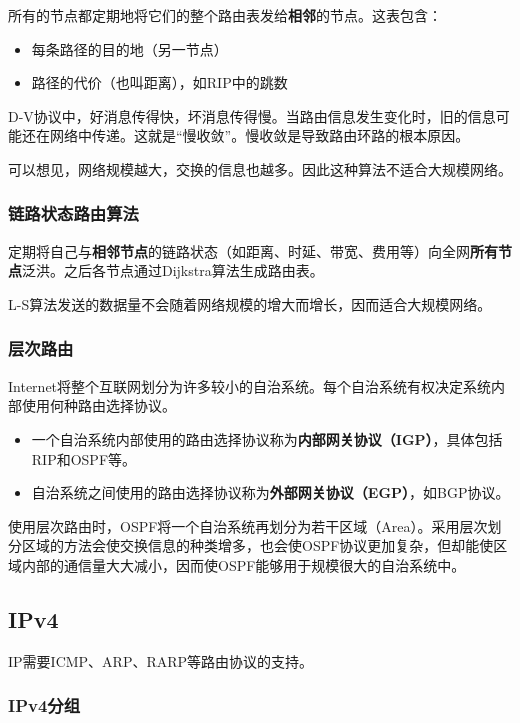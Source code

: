 \documentclass[12pt, a4paper, oneside]{ctexart}
\begin{document}
所有的节点都定期地将它们的整个路由表发给\textbf{相邻}的节点。这表包含：
\begin{itemize}
    \item 每条路径的目的地（另一节点）
    \item 路径的代价（也叫距离），如RIP中的跳数
\end{itemize}

D-V协议中，好消息传得快，坏消息传得慢。当路由信息发生变化时，旧的信息可能还在网络中传递。这就是“慢收敛”。慢收敛是导致路由环路的根本原因。

可以想见，网络规模越大，交换的信息也越多。因此这种算法不适合大规模网络。

\subsubsection{链路状态路由算法}

定期将自己与\textbf{相邻节点}的链路状态（如距离、时延、带宽、费用等）向全网\textbf{所有节点}泛洪。之后各节点通过Dijkstra算法生成路由表。

L-S算法发送的数据量不会随着网络规模的增大而增长，因而适合大规模网络。

\subsubsection{层次路由}

Internet将整个互联网划分为许多较小的自治系统。每个自治系统有权决定系统内部使用何种路由选择协议。
\begin{itemize}
    \item 一个自治系统内部使用的路由选择协议称为\textbf{内部网关协议（IGP）}，具体包括RIP和OSPF等。
    \item 自治系统之间使用的路由选择协议称为\textbf{外部网关协议（EGP）}，如BGP协议。
\end{itemize}

使用层次路由时，OSPF将一个自治系统再划分为若干区域（Area）。采用层次划分区域的方法会使交换信息的种类增多，也会使OSPF协议更加复杂，但却能使区域内部的通信量大大减小，因而使OSPF能够用于规模很大的自治系统中。

\subsection{IPv4}

IP需要ICMP、ARP、RARP等路由协议的支持。

\subsubsection{IPv4分组}
\end{document}
